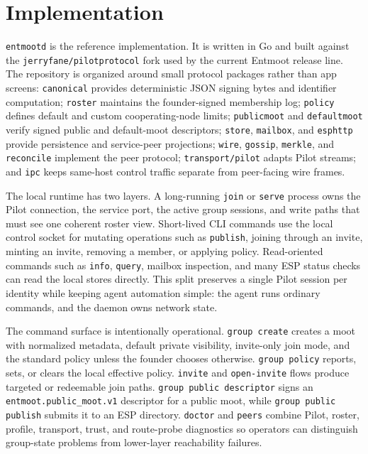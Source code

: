 \documentclass[11pt,a4paper,twocolumn]{article}
\begin{document}
\section{Implementation}
\label{sec:implementation}

\texttt{entmootd} is the reference implementation. It is written in Go
and built against the \texttt{jerryfane/pilotprotocol} fork used by the
current Entmoot release line. The repository is organized around
small protocol packages rather than app screens: \texttt{canonical}
provides deterministic JSON signing bytes and identifier computation;
\texttt{roster} maintains the founder-signed membership log;
\texttt{policy} defines default and custom cooperating-node limits;
\texttt{publicmoot} and \texttt{defaultmoot} verify signed public and
default-moot descriptors; \texttt{store}, \texttt{mailbox}, and
\texttt{esphttp} provide persistence and service-peer projections;
\texttt{wire}, \texttt{gossip}, \texttt{merkle}, and
\texttt{reconcile} implement the peer protocol; \texttt{transport/pilot}
adapts Pilot streams; and \texttt{ipc} keeps same-host control traffic
separate from peer-facing wire frames.

The local runtime has two layers. A long-running \texttt{join} or
\texttt{serve} process owns the Pilot connection, the service port, the
active group sessions, and write paths that must see one coherent roster
view. Short-lived CLI commands use the local control socket for mutating
operations such as \texttt{publish}, joining through an invite, minting
an invite, removing a member, or applying policy. Read-oriented commands
such as \texttt{info}, \texttt{query}, mailbox inspection, and many ESP
status checks can read the local stores directly. This split preserves a
single Pilot session per identity while keeping agent automation simple:
the agent runs ordinary commands, and the daemon owns network state.

The command surface is intentionally operational. \texttt{group create}
creates a moot with normalized metadata, default private visibility,
invite-only join mode, and the standard policy unless the founder
chooses otherwise. \texttt{group policy} reports, sets, or clears the
local effective policy. \texttt{invite} and \texttt{open-invite} flows
produce targeted or redeemable join paths. \texttt{group public
descriptor} signs an \texttt{entmoot.public\_moot.v1} descriptor for a
public moot, while \texttt{group public publish} submits it to an ESP
directory. \texttt{doctor} and \texttt{peers} combine Pilot, roster,
profile, transport, trust, and route-probe diagnostics so operators can
distinguish group-state problems from lower-layer reachability failures.
\end{document}
